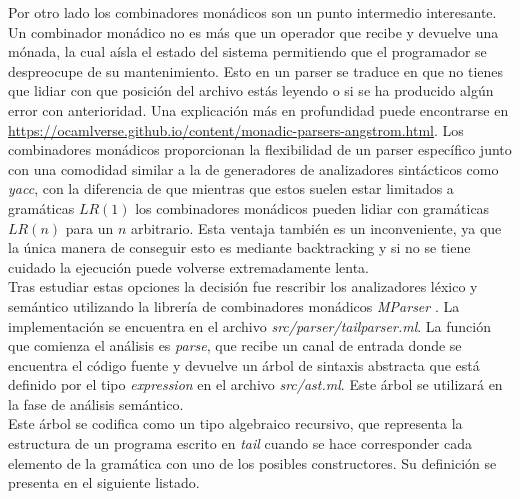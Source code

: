Por otro lado los combinadores monádicos son un punto intermedio interesante. Un combinador monádico no es más que un operador que recibe y devuelve una mónada, la cual aísla el estado del sistema permitiendo que el programador se despreocupe de su mantenimiento. Esto en un parser se traduce en que no tienes que lidiar con que posición del archivo estás leyendo o si se ha producido algún error con anterioridad. Una explicación más en profundidad puede encontrarse en \url{https://ocamlverse.github.io/content/monadic-parsers-angstrom.html}. Los combinadores monádicos proporcionan la flexibilidad de un parser específico junto con una comodidad similar a la de generadores de analizadores sintácticos como \textit{yacc}, con la diferencia de que mientras que estos suelen estar limitados a gramáticas $LR(1)$ los combinadores monádicos pueden lidiar con gramáticas $LR(n)$ para un $n$ arbitrario. Esta ventaja también es un inconveniente, ya que la única manera de conseguir esto es mediante backtracking y si no se tiene cuidado la ejecución puede volverse extremadamente lenta.\\

Tras estudiar estas opciones la decisión fue rescribir los analizadores léxico y semántico utilizando la librería de combinadores monádicos \textit{MParser} \cite{mparser}. La implementación se encuentra en el archivo \textit{src/parser/tailparser.ml}. La función que comienza el análisis es \textit{parse}, que recibe un canal de entrada donde se encuentra el código fuente y devuelve un árbol de sintaxis abstracta que está definido por el tipo \textit{expression} en el archivo \textit{src/ast.ml}. Este árbol se utilizará en la fase de análisis semántico.\\

Este árbol se codifica como un tipo algebraico recursivo, que representa la estructura de un programa escrito en \textit{tail} cuando se hace corresponder cada elemento de la gramática con uno de los posibles constructores. Su definición se presenta en el siguiente listado.\\

